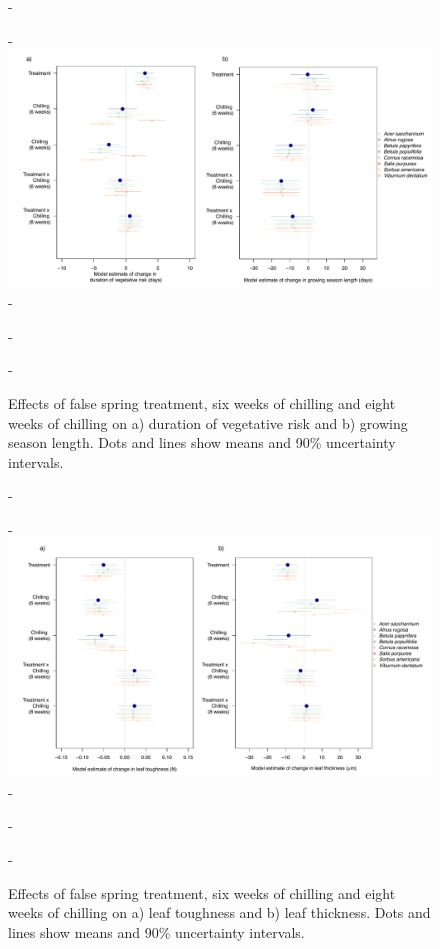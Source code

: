 \documentclass{article}\usepackage[]{graphicx}\usepackage[]{color}
\begin{document}
\begin{enumerate}
  {\begin{figure} [H]
  -\begin{center}
  -\includegraphics[width=18cm]{..//analyses/figures/mu_phen90.pdf} 
  -\caption{Effects of false spring treatment, six weeks of chilling and eight weeks of chilling on a) duration of vegetative risk and b) growing season length. Dots and lines show means and 90\% uncertainty intervals.}\label{fig:muphen}
  -\end{center}
  -\end{figure}}
  
  {\begin{figure} [H]
  -\begin{center}
  -\includegraphics[width=18cm]{..//analyses/figures/mu_leaftraits90.pdf} 
  -\caption{Effects of false spring treatment, six weeks of chilling and eight weeks of chilling on a) leaf toughness and b) leaf thickness. Dots and lines show means and 90\% uncertainty intervals. }\label{fig:muleaf}
  -\end{center}
  -\end{figure}}
  

\end{enumerate}
\end{document}
